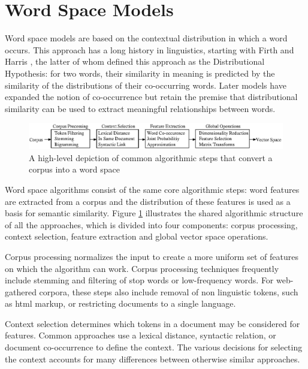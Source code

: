 \section{Word Space Models}
\label{sec:sspace}

Word space models are based on the contextual distribution in which a word
occurs.  This approach has a long history in linguistics, starting with Firth
 and Harris , the
latter of whom defined this approach as the Distributional Hypothesis: for two
words, their similarity in meaning is predicted by the similarity of the
distributions of their co-occurring words.  Later models have expanded the
notion of co-occurrence but retain the premise that distributional similarity
can be used to extract meaningful relationships between words.

\begin{figure}[bt!f!p]
  \center \includegraphics[width=1\textwidth]{figures/s-space-alg.eps}
  \caption{A high-level depiction of common algorithmic steps that convert a
    corpus into a word space}
  \label{fig:algorithm} 
\end{figure}

Word space algorithms consist of the same core algorithmic steps: word features
are extracted from a corpus and the distribution of these features is used as a
basis for semantic similarity.  Figure \ref{fig:algorithm} illustrates the
shared algorithmic structure of all the approaches, which is divided into four
components: corpus processing, context selection, feature extraction and global
vector space operations.

Corpus processing normalizes the input to create a more uniform set of features
on which the algorithm can work.  Corpus processing techniques frequently
include stemming and filtering of stop words or low-frequency words.  For
web-gathered corpora, these steps also include removal of non linguistic tokens,
such as html markup, or restricting documents to a single language.

Context selection determines which tokens in a document may be considered for
features.  Common approaches use a lexical distance, syntactic relation, or
document co-occurrence to define the context.  The various decisions for
selecting the context accounts for many differences between otherwise similar
approaches.

